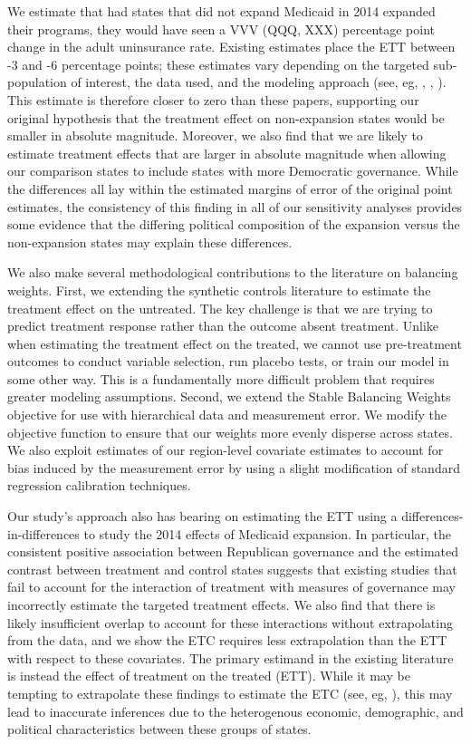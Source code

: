 \documentclass[12pt]{article}
\begin{document}
We estimate that had states that did not expand Medicaid in 2014 expanded their programs, they would have seen a VVV (QQQ, XXX) percentage point change in the adult uninsurance rate. Existing estimates place the ETT between -3 and -6 percentage points; these estimates vary depending on the targeted sub-population of interest, the data used, and the modeling approach (see, eg, \cite{courtemanche2017early}, \cite{kaestner2017effects}, \cite{frean2017premium}). This estimate is therefore closer to zero than these  papers, supporting our original hypothesis that the treatment effect on non-expansion states would be smaller in absolute magnitude. Moreover, we also find that we are likely to estimate treatment effects that are larger in absolute magnitude when allowing our comparison states to include states with more Democratic governance. While the differences all lay within the estimated margins of error of the original point estimates, the consistency of this finding in all of our sensitivity analyses provides some evidence that the differing political composition of the expansion versus the non-expansion states may explain these differences. 

We also make several methodological contributions to the literature on balancing weights. First, we extending the synthetic controls literature to estimate the treatment effect on the untreated. The key challenge is that we are trying to predict treatment response rather than the outcome absent treatment. Unlike when estimating the treatment effect on the treated, we cannot use pre-treatment outcomes to conduct variable selection, run placebo tests, or train our model in some other way. This is a fundamentally more difficult problem that requires greater modeling assumptions. Second, we extend the Stable Balancing Weights objective for use with hierarchical data and measurement error. We modify the objective function to ensure that our weights more evenly disperse across states. We also exploit estimates of our region-level covariate estimates to account for bias induced by the measurement error by using a slight modification of standard regression calibration techniques.

Our study's approach also has bearing on estimating the ETT using a differences-in-differences to study the 2014 effects of Medicaid expansion. In particular, the consistent positive association between Republican governance and the estimated contrast between treatment and control states suggests that existing studies that fail to account for the interaction of treatment with measures of governance may incorrectly estimate the targeted treatment effects. We also find that there is likely insufficient overlap to account for these interactions without extrapolating from the data, and we show the ETC requires less extrapolation than the ETT with respect to these covariates. The primary estimand in the existing literature is instead the effect of treatment on the treated (ETT). While it may be tempting to extrapolate these findings to estimate the ETC (see, eg, \cite{miller2019medicaid}), this may lead to inaccurate inferences due to the heterogenous economic, demographic, and political characteristics between these groups of states.
\end{document}
